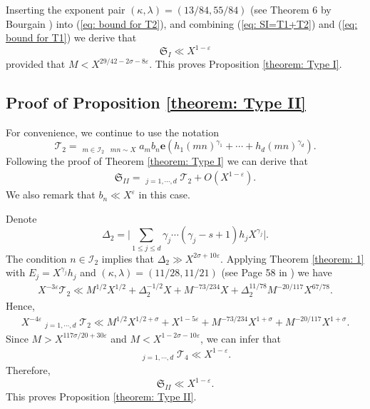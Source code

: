 \documentclass[12pt, reqno, twoside, letterpaper]{amsart}
\numberwithin{equation}{section}
\newcommand{\cT}{\ensuremath{\mathcal{T}}}
\theoremstyle{customthm}
\theoremstyle{customrem}
\begin{document}
Inserting the exponent pair $(\kappa,\lambda)=(13/84,55/84)$
(see Theorem 6 by Bourgain \cite{Bour}) into (\ref{eq: bound for T2}), and combining
(\ref{eq: SI=T1+T2}) and (\ref{eq: bound for T1}) we derive that
$$
\mathfrak{S}_{I}\ll X^{1-\varepsilon}
$$
provided that $M<X^{29/42-2\sigma-8\varepsilon}$.
This proves Proposition \ref{theorem: Type I}.

\subsection{Proof of Proposition \ref{theorem: Type II}}

For convenience, we continue to use the notation
$$
\cT_2=\mathop{\sum_{m\sim M}}_{m\in\mathcal{I}_2}
\mathop{\sum_{n\sim N}}_{mn\sim X}a_mb_n\mathbf{e}\left(h_1(mn)^{\gamma_1}
+\cdots+h_d(mn)^{\gamma_d}\right).
$$
Following the proof of Theorem \ref{theorem: Type I} we can derive that
\begin{align*}
\mathfrak{S}_{II}=\mathop{\sum_{1<|h_j|<X^{\delta_j}\mathcal{L}}}_{j=1,\cdots,d}\cT_2
+O\left(X^{1-\varepsilon}\right).
\end{align*}
We also remark that $b_n\ll X^{\varepsilon}$ in this case.

Denote
$$
\Delta_2=\Bigg|\sum_{1\leqslant j\leqslant d}\gamma_j\cdots(\gamma_j-s+1)h_jX^{\gamma_j}\Bigg|.
$$
The condition $n\in \mathcal{I}_2$ implies that $\Delta_2\gg X^{2\sigma+10\varepsilon}$.
Applying Theorem \ref{theorem: 1} with $E_j=X^{\gamma_j}h_j$
and $(\kappa,\lambda)=(11/28,11/21)$ (see Page 58 in \cite{Mont1994}) we have
\begin{align*}
X^{-3\varepsilon}\cT_2\ll M^{1/2}X^{1/2}+\Delta_2^{-1/2}X
+M^{-73/234}X
+\Delta_2^{11/78}M^{-20/117}X^{67/78}.
\end{align*}
Hence,
\begin{align*}
X^{-4\varepsilon}\mathop{\sum_{1<|h_j|<X^{\delta_j}\mathcal{L}}}_{j=1,\cdots,d}\cT_2
\ll M^{1/2}X^{1/2+\sigma}+X^{1-5\varepsilon}+M^{-73/234}X^{1+\sigma}
+M^{-20/117}X^{1+\sigma}.
\end{align*}
Since $M>X^{117\sigma/20+30\varepsilon}$ and $M<X^{1-2\sigma-10\varepsilon}$,
we can infer that
\begin{align*}
\mathop{\sum_{1<|h_j|<X^{\delta_j}\mathcal{L}}}_{j=1,\cdots,d}\cT_4\ll X^{1-\varepsilon}.
\end{align*}
Therefore,
$$
\mathfrak{S}_{II}\ll X^{1-\varepsilon}.
$$
This proves Proposition \ref{theorem: Type II}.
\end{document}
